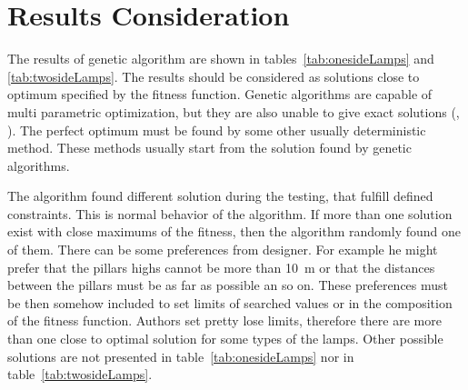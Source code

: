 \section{Results Consideration}

The results of genetic algorithm are shown in tables~\ref{tab:onesideLamps} and \ref{tab:twosideLamps}. The results should be considered as solutions close to optimum specified by the fitness function. Genetic algorithms are capable of multi parametric optimization, but they are also unable to give exact solutions (\cite{Zelinka2009}, \cite{Fogel2006}). The perfect optimum must be found by some other usually deterministic method. These methods usually start from the solution found by genetic algorithms.

The algorithm found different solution during the testing, that fulfill defined constraints. This is normal behavior of the algorithm. If more than one solution exist with close maximums of the fitness, then the algorithm randomly found one of them. There can be some preferences from designer. For example he might prefer that the pillars highs cannot be more than 10~m or that the distances between the pillars must be as far as possible an so on. These preferences must be then somehow included to set limits of searched values or in the composition of the fitness function. Authors set pretty lose limits, therefore there are more than one close to optimal solution for some types of the lamps. Other possible solutions are not presented in table~\ref{tab:onesideLamps} nor in table~\ref{tab:twosideLamps}.
 
